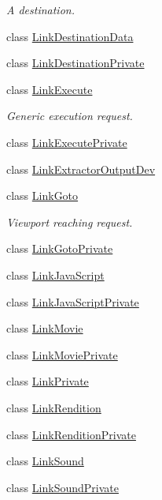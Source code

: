 \begin{DoxyCompactItemize}
\begin{DoxyCompactList}\small\item\em A destination. \end{DoxyCompactList}\item 
class \hyperlink{class_poppler_1_1_link_destination_data}{Link\+Destination\+Data}
\item 
class \hyperlink{class_poppler_1_1_link_destination_private}{Link\+Destination\+Private}
\item 
class \hyperlink{class_poppler_1_1_link_execute}{Link\+Execute}
\begin{DoxyCompactList}\small\item\em Generic execution request. \end{DoxyCompactList}\item 
class \hyperlink{class_poppler_1_1_link_execute_private}{Link\+Execute\+Private}
\item 
class \hyperlink{class_poppler_1_1_link_extractor_output_dev}{Link\+Extractor\+Output\+Dev}
\item 
class \hyperlink{class_poppler_1_1_link_goto}{Link\+Goto}
\begin{DoxyCompactList}\small\item\em Viewport reaching request. \end{DoxyCompactList}\item 
class \hyperlink{class_poppler_1_1_link_goto_private}{Link\+Goto\+Private}
\item 
class \hyperlink{class_poppler_1_1_link_java_script}{Link\+Java\+Script}
\item 
class \hyperlink{class_poppler_1_1_link_java_script_private}{Link\+Java\+Script\+Private}
\item 
class \hyperlink{class_poppler_1_1_link_movie}{Link\+Movie}
\item 
class \hyperlink{class_poppler_1_1_link_movie_private}{Link\+Movie\+Private}
\item 
class \hyperlink{class_poppler_1_1_link_private}{Link\+Private}
\item 
class \hyperlink{class_poppler_1_1_link_rendition}{Link\+Rendition}
\item 
class \hyperlink{class_poppler_1_1_link_rendition_private}{Link\+Rendition\+Private}
\item 
class \hyperlink{class_poppler_1_1_link_sound}{Link\+Sound}
\item 
class \hyperlink{class_poppler_1_1_link_sound_private}{Link\+Sound\+Private}
\item 

\end{DoxyCompactItemize}

